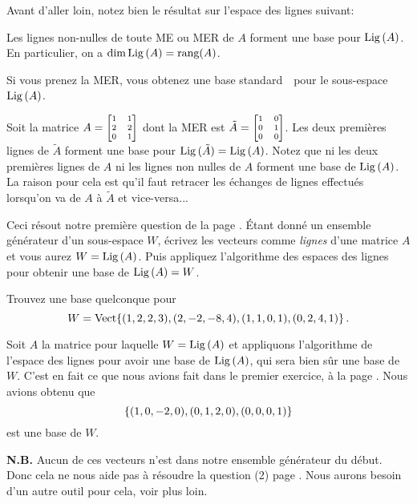 Avant d'aller loin, notez bien le résultat sur l'espace des lignes suivant:

\begin{theorem}\label{basisRowA}
Les lignes non-nulles de toute ME ou MER de $A$ forment une base pour $\row(A)$. En particulier, on a $\dim \row(A)=\rank (A)$.
\end{theorem}

Si vous prenez la MER, vous obtenez une \og base standard\ \fg\  pour le sous-espace $\row(A)$.


\begin{myexample}
Soit la matrice $A = \scriptsize\mat{1&1\\2&2\\0&1}$ dont la MER est $\tilde A=\scriptsize\mat{1&0\\0&1\\0&0}$.
Les deux premières lignes de $\tilde A$ forment une base pour $\row(\tilde A)=\row(A)$. Notez que 
ni les deux premières lignes de $A$  ni les lignes non nulles
de $A$ forment une base de $\row(A)$.  La raison pour cela est qu'il faut retracer les échanges de lignes effectu\'es lorsqu'on va de $A$ \`a $\tilde{A}$ et vice-versa...
\end{myexample}

Ceci résout notre premi\`ere question de la page \pageref{FindingBases}. Étant donné un ensemble g\'en\'erateur d'un sous-espace $W$, écrivez les vecteurs comme {\it lignes} d'une matrice $A$ et vous aurez $W=\row(A)$. Puis appliquez l'algorithme des espaces des lignes pour obtenir une base de $\row(A)=W$.

\begin{myexample}
Trouvez une base quelconque pour $$
W = \sp{(1,2,2,3),(2,-2,-8,4),(1,1,0,1),(0,2,4,1)}\,.
$$

Soit  $A$ la matrice pour laquelle $W=\row(A)$ et appliquons l'algorithme de l'espace des lignes pour avoir une base de $\row(A)$, qui sera bien sûr une base de $W$. C'est en fait ce que nous avions fait dans le premier exercice, à la page \pageref{rowspace1}.
Nous avions obtenu que 
$$\set{(1,0,-2,0), (0,1,2,0), (0,0,0,1)}$$ est une base de $W$. 

{\bf N.B.} Aucun de ces vecteurs n'est dans notre ensemble g\'en\'erateur du d\'ebut. Donc cela ne nous aide pas à résoudre la question (2) page  \pageref{FindingBases}. Nous aurons besoin d'un autre outil pour cela, voir plus loin.
\end{myexample}

